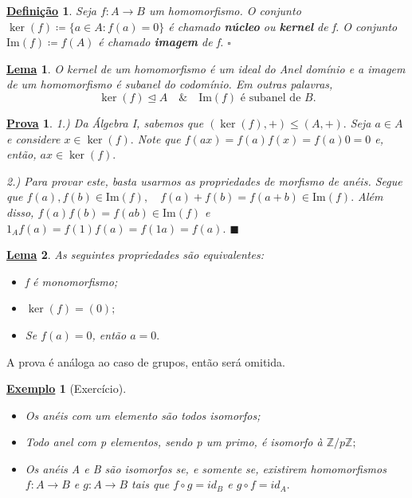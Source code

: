 \documentclass{article}
\newtheorem*{def*}{\underline{Defini\c c\~ao}}
\newtheorem*{lemma*}{\underline{Lema}}
\newtheorem{example}{\underline{Exemplo}}
\newtheorem*{proof*}{\underline{Prova}}
\renewcommand\qedsymbol{$\blacksquare$}
\begin{document}
\begin{def*}
  Seja \(f:A\rightarrow B\) um homomorfismo. O conjunto \(\ker{(f)}\coloneqq \{a\in A: f(a) = 0\}\)
  é chamado \textbf{núcleo} ou \textbf{kernel} de f. O conjunto \(\mathrm{Im}(f)\coloneqq f(A)\) é chamado 
  \textbf{imagem} de f. \(\square\)
\end{def*}
\begin{lemma*}
  O kernel de um homomorfismo é um ideal do Anel domínio e a imagem de um homomorfismo é subanel do codomínio. Em outras palavras,
  \[
    \ker{(f)}\trianglelefteq{A}\quad\&\quad \mathrm{Im}(f)\text{ é subanel de }B.
  \]
\end{lemma*}
\begin{proof*}
  1.) Da Álgebra I, sabemos que \((\ker{(f)}, +)\leq (A, +).\) Seja \(a\in A\) e 
  considere \(x\in\ker{(f)}.\) Note que \(f(ax) = f(a)f(x) = f(a)0 = 0\) e, então, \(ax\in\ker{(f)}.\)

  2.) Para provar este, basta usarmos as propriedades de morfismo de anéis. Segue que
  \(f(a), f(b)\in \mathrm{Im}(f),\quad f(a) + f(b) = f(a+b)\in \mathrm{Im}(f).\) Além disso,
  \(f(a)f(b) = f(ab)\in \mathrm{Im}(f)\) e \(1_{A}f(a) = f(1)f(a) = f(1a) = f(a).\) \qedsymbol
\end{proof*}
\begin{lemma*}
  As seguintes propriedades são equivalentes:
  \begin{itemize}
    \item[1)] f é monomorfismo;
    \item[2)] \(\ker{(f)} = (0);\)
    \item[3)] Se \(f(a) = 0\), então \(a=0.\)
  \end{itemize}
\end{lemma*}
A prova é análoga ao caso de grupos, então será omitida.
\begin{example}[Exercício]
  \begin{itemize}
    \item[1)] Os anéis com um elemento são todos isomorfos;
    \item[2)] Todo anel com p elementos, sendo p um primo, é isomorfo à \(\mathbb{Z}/p \mathbb{Z};\)
    \item[3)] Os anéis A e B são isomorfos se, e somente se, existirem homomorfismos
      \(f:A\rightarrow B\) e \(g:A\rightarrow B\) tais que \(f\circ{g}=id_{B}\) e \(g\circ{f} = id_{A}.\)
  \end{itemize} 
\end{example}
\end{document}
